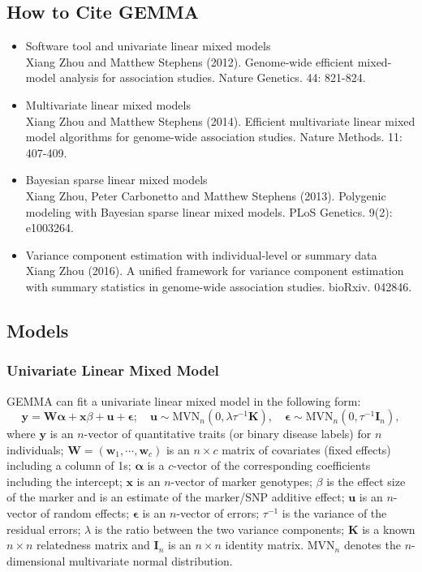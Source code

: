 \documentclass[11pt]{article}
\newcommand{\bx}{\mathbf{x}}
\newcommand{\by}{\mathbf{y}}
\newcommand{\bu}{\mathbf{u}}
\newcommand{\bw}{\mathbf{w}}
\newcommand{\bK}{\mathbf{K}}
\newcommand{\bW}{\mathbf{W}}
\newcommand{\bI}{\mathbf{I}}
\newcommand{\bepsilon}{\boldsymbol\epsilon}
\newcommand{\balpha}{\boldsymbol\alpha}
\begin{document}
\subsection{How to Cite GEMMA}
\begin{itemize}

\item Software tool and univariate linear mixed models \\ Xiang Zhou
  and Matthew Stephens (2012). Genome-wide efficient mixed-model
  analysis for association studies. Nature Genetics. 44: 821-824.

\item Multivariate linear mixed models \\ Xiang Zhou and Matthew
  Stephens (2014). Efficient multivariate linear mixed model
  algorithms for genome-wide association studies. Nature Methods. 11:
  407-409.

\item Bayesian sparse linear mixed models \\ Xiang Zhou, Peter
  Carbonetto and Matthew Stephens (2013). Polygenic modeling with
  Bayesian sparse linear mixed models. PLoS Genetics. 9(2): e1003264.

\item Variance component estimation with individual-level or summary
  data\\ Xiang Zhou (2016). A unified framework for variance component
  estimation with summary statistics in genome-wide association
  studies. bioRxiv. 042846.
\end{itemize}

\subsection{Models}
\subsubsection{Univariate Linear Mixed Model}
GEMMA can fit a univariate linear mixed model in the following form:
%
\begin{equation*}
\by=\bW \balpha+\bx\beta+\bu+\bepsilon;   \quad \bu\sim \mbox{MVN}_n(0, \lambda \tau^{-1} \bK), \quad \bepsilon \sim \mbox{MVN}_n(0, \tau^{-1} \bI_n),
\end{equation*}
%
where $\by$ is an $n$-vector of quantitative traits (or binary disease
labels) for $n$ individuals; $\bW=(\bw_1, \cdots, \bw_c)$ is an
$n\times c$ matrix of covariates (fixed effects) including a column of
1s; $\boldsymbol \alpha$ is a $c$-vector of the corresponding
coefficients including the intercept; $\bx$ is an $n$-vector of marker
genotypes; $\beta$ is the effect size of the marker and is an estimate
 of the marker/SNP additive effect; $\bu$ is an
$n$-vector of random effects; $\bepsilon$ is an $n$-vector of errors;
$\tau^{-1}$ is the variance of the residual errors; $\lambda$ is the
ratio between the two variance components; $\bK$ is a known $n\times
n$ relatedness matrix and $\bI_n$ is an $n\times n$ identity
matrix. $\mbox{MVN}_n$ denotes the $n$-dimensional multivariate normal
distribution.
\end{document}
